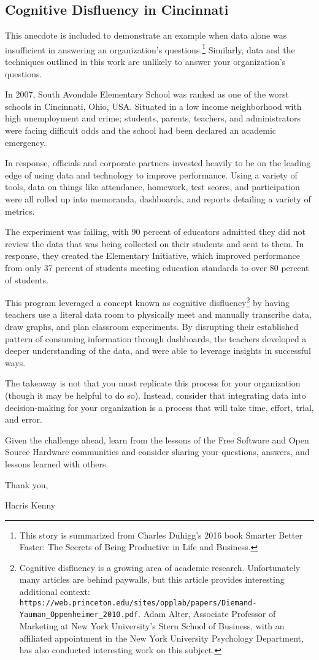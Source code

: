 \subsection{Cognitive Disfluency in Cincinnati}
This anecdote is included to demonstrate an example when data alone was insufficient in answering an organization's questions.\footnote{This story is summarized from Charles Duhigg's 2016 book Smarter Better Faster: The Secrets of Being Productive in Life and Business.} Similarly, data and the techniques outlined in this work are unlikely to answer your organization's questions.

In 2007, South Avondale Elementary School was ranked as one of the worst schools in Cincinnati, Ohio, USA. Situated in a low income neighborhood with high unemployment and crime; students, parents, teachers, and administrators were facing difficult odds and the school had been declared an academic emergency. 

In response, officials and corporate partners invested heavily to be on the leading edge of using data and technology to improve performance. Using a variety of tools, data on things like attendance, homework, test scores, and participation were all rolled up into memoranda, dashboards, and reports detailing a variety of metrics.

The experiment was failing, with 90 percent of educators admitted they did not review the data that was being collected on their students and sent to them. In response, they created the Elementary Initiative, which improved performance from only 37 percent of students meeting education standards to over 80 percent of students.

This program leveraged a concept known as cognitive disfluency\footnote{Cognitive disfluency is a growing area of academic research. Unfortunately many articles are behind paywalls, but this article provides interesting additional context: \texttt{https://web.princeton.edu/sites/opplab/papers/Diemand-Yauman_Oppenheimer_2010.pdf}. Adam Alter, Associate Professor of Marketing at New York University's Stern School of Business, with an affiliated appointment in the New York University Psychology Department, has also conducted interesting work on this subject.} by having teachers use a literal data room to physically meet and manually transcribe data, draw graphs, and plan classroom experiments. By disrupting their established pattern of consuming information through dashboards, the teachers developed a deeper understanding of the data, and were able to leverage insights in successful ways.

The takeaway is not that you must replicate this process for your organization (though it may be helpful to do so). Instead, consider that integrating data into decision-making for your organization is a process that will take time, effort, trial, and error.

Given the challenge ahead, learn from the lessons of the Free Software and Open Source Hardware communities and consider sharing your questions, answers, and lessons learned with others.

Thank you,

Harris Kenny